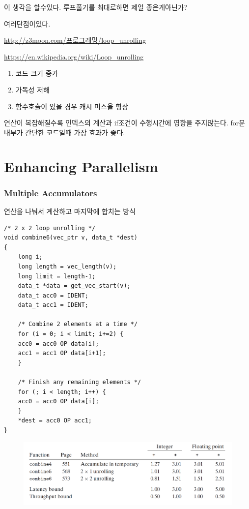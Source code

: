 이 생각을 할수있다.
루프풀기를 최대로하면 제일 좋은게아닌가?

여러단점이있다.

\url{http://z3moon.com/프로그래밍/loop_unrolling}

\url{https://en.wikipedia.org/wiki/Loop_unrolling}

\begin{enumerate}
    \item 코드 크기 증가
    \item 가독성 저해
    \item 함수호출이 있을 경우 캐시 미스율 향상
\end{enumerate}

연산이 복잡해질수록 인덱스의 계산과 if조건이 수행시간에 영향을 주지않는다.
for문 내부가 간단한 코드일때 가장 효과가 좋다.

\section{Enhancing Parallelism}

\subsubsection{Multiple Accumulators}
연산을 나눠서 계산하고 마지막에 합치는 방식

\begin{lstlisting}[style = CStyle]
/* 2 x 2 loop unrolling */
void combine6(vec_ptr v, data_t *dest)
{
    long i;
    long length = vec_length(v);
    long limit = length-1;
    data_t *data = get_vec_start(v);
    data_t acc0 = IDENT;
    data_t acc1 = IDENT;

    /* Combine 2 elements at a time */
    for (i = 0; i < limit; i+=2) {
    acc0 = acc0 OP data[i];
    acc1 = acc1 OP data[i+1];
    }

    /* Finish any remaining elements */
    for (; i < length; i++) {
    acc0 = acc0 OP data[i];
    }
    *dest = acc0 OP acc1;
}
\end{lstlisting}

\begin{figure}[h!]
    \centering
    \includegraphics[scale=0.3]{pic/section5/pic7}
\end{figure}



